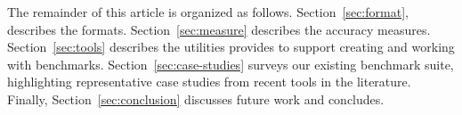 \documentclass[main.tex]{subfiles}
\begin{document}
The remainder of this article is organized as follows.
Section~\ref{sec:format}, describes the \name formats.
Section~\ref{sec:measure} describes the accuracy measures.
Section~\ref{sec:tools} describes the utilities \name provides to
support creating and working with benchmarks.
Section~\ref{sec:case-studies} surveys our existing benchmark suite,
highlighting representative case studies from recent tools in the
literature.  Finally, Section~\ref{sec:conclusion} discusses future work
and concludes.


\end{document}
